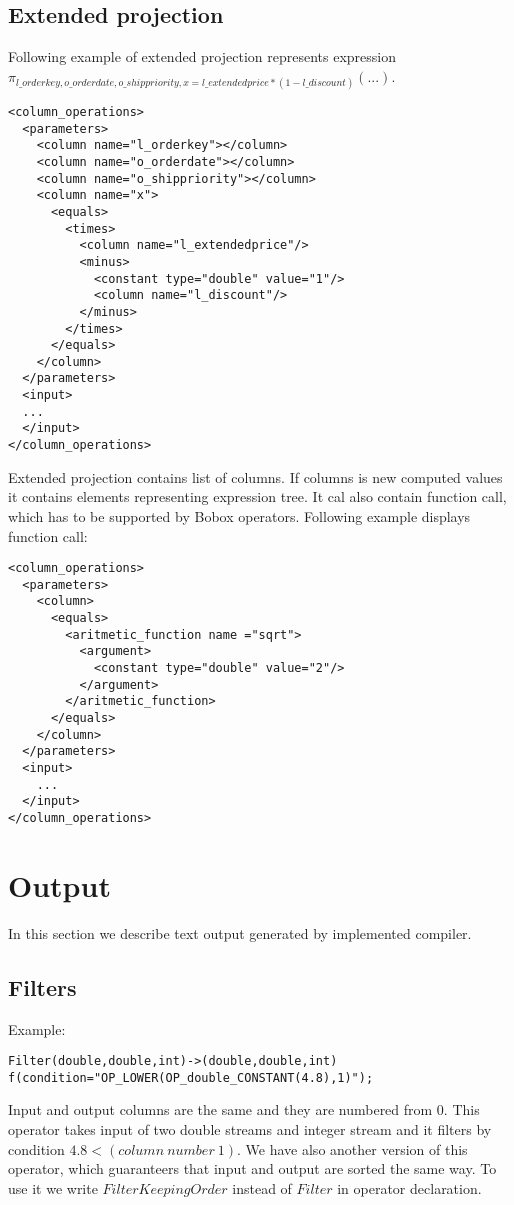 \subsection{Extended projection}
Following example of extended projection represents expression \\ $\pi_{l\_orderkey,o\_orderdate,o\_shippriority,x=l\_extendedprice*(1-l\_discount)}(...)$.
\begin{lstlisting}
<column_operations>
  <parameters>
    <column name="l_orderkey"></column>
    <column name="o_orderdate"></column>
    <column name="o_shippriority"></column>
    <column name="x">
      <equals>
        <times>
          <column name="l_extendedprice"/>
          <minus>
            <constant type="double" value="1"/>
            <column name="l_discount"/>
          </minus>
        </times>
      </equals>
    </column>
  </parameters>
  <input>
  ...
  </input>
</column_operations>
\end{lstlisting}

Extended projection contains list of columns. If columns is new computed values it contains elements representing expression tree. It cal also contain function call, which has to be supported by Bobox operators. Following example displays function call:


\begin{lstlisting}
<column_operations>
  <parameters>
    <column>
      <equals>
        <aritmetic_function name ="sqrt">
          <argument>
            <constant type="double" value="2"/>
          </argument>
        </aritmetic_function>
      </equals>
    </column>
  </parameters>
  <input>
    ...
  </input>
</column_operations>
\end{lstlisting}
 

\section{Output}

In this section we describe text output generated by implemented compiler.

\subsection{Filters}
Example: 
\begin{lstlisting}
Filter(double,double,int)->(double,double,int)
f(condition="OP_LOWER(OP_double_CONSTANT(4.8),1)"); 
\end{lstlisting}

Input and output columns are the same and they are numbered from 0.
This operator takes input of two double streams and integer stream and it filters by condition $4.8<(column~number~1)$. We have also another version of this operator, which guaranteers that input and output are sorted the same way. To use it we write $FilterKeepingOrder$ instead of $Filter$ in operator declaration. 

